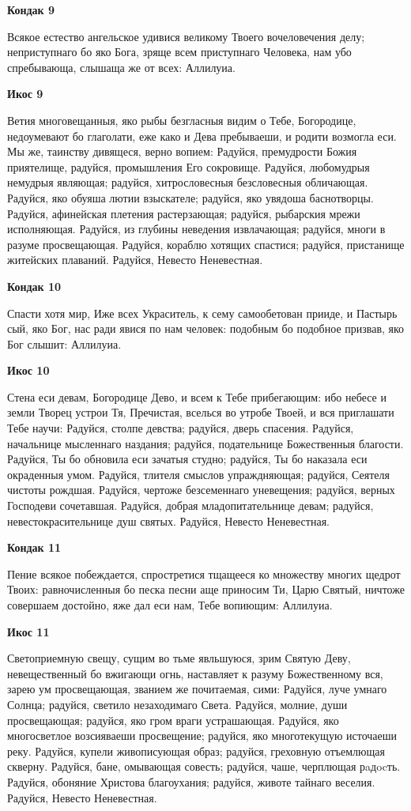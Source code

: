 \bfseries Кондак 9\normalfont{}


Всякое естество ангельское удивися великому Твоего вочеловечения делу; неприступнаго бо яко Бога, зряще всем приступнаго Человека, нам убо спребывающа, слышаща же от всех: Аллилуиа.


\bfseries Икос 9\normalfont{}


Ветия многовещанныя, яко рыбы безгласныя видим о Тебе, Богородице, недоумевают бо глаголати, еже како и Дева пребываеши, и родити возмогла еси. Мы же, таинству дивящеся, верно вопием: Радуйся, премудрости Божия приятелище, радуйся, промышления Его сокровище. Радуйся, любомудрыя немудрыя являющая; радуйся, хитрословесныя безсловесныя обличающая. Радуйся, яко обуяша лютии взыскателе; радуйся, яко увядоша баснотворцы. Радуйся, афинейская плетения растерзающая; радуйся, рыбарския мрежи исполняющая. Радуйся, из глубины неведения извлачающая; радуйся, многи в разуме просвещающая. Радуйся, кораблю хотящих спастися; радуйся, пристанище житейских плаваний. Радуйся, Невесто Неневестная.


\bfseries Кондак 10\normalfont{}


Спасти хотя мир, Иже всех Украситель, к сему самообетован прииде, и Пастырь сый, яко Бог, нас ради явися по нам человек: подобным бо подобное призвав, яко Бог слышит: Аллилуиа.


\bfseries Икос 10\normalfont{}


Стена еси девам, Богородице Дево, и всем к Тебе прибегающим: ибо небесе и земли Творец устрои Тя, Пречистая, вселься во утробе Твоей, и вся приглашати Тебе научи: Радуйся, столпе девства; радуйся, дверь спасения. Радуйся, начальнице мысленнаго наздания; радуйся, подательнице Божественныя благости. Радуйся, Ты бо обновила еси зачатыя студно; радуйся, Ты бо наказала еси окраденныя умом. Радуйся, тлителя смыслов упраждняющая; радуйся, Сеятеля чистоты рождшая. Радуйся, чертоже безсеменнаго уневещения; радуйся, верных Господеви сочетавшая. Радуйся, добрая младопитательнице девам; радуйся, невестокрасительнице душ святых. Радуйся, Невесто Неневестная.


\bfseries Кондак 11\normalfont{}


Пение всякое побеждается, спростретися тщащееся ко множеству многих щедрот Твоих: равночисленныя бо песка песни аще приносим Ти, Царю Святый, ничтоже совершаем достойно, яже дал еси нам, Тебе вопиющим: Аллилуиа.


\bfseries Икос 11\normalfont{}


Светоприемную свещу, сущим во тьме явльшуюся, зрим Святую Деву, невещественный бо вжигающи огнь, наставляет к разуму Божественному вся, зарею ум просвещающая, званием же почитаемая, сими: Радуйся, луче умнаго Солнца; радуйся, светило незаходимаго Света. Радуйся, молние, души просвещающая; радуйся, яко гром враги устрашающая. Радуйся, яко многосветлое возсияваеши просвещение; радуйся, яко многотекущую источаеши реку. Радуйся, купели живописующая образ; радуйся, греховную отъемлющая скверну. Радуйся, бане, омывающая совесть; радуйся, чаше, черплющая рaдocть. Радуйся, обоняние Христова благоухания; радуйся, животе тайнаго веселия. Радуйся, Невесто Неневестная.


